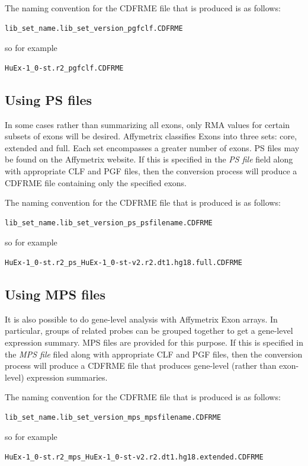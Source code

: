\documentclass[11pt]{report}
\begin{document}
The naming convention for the CDFRME file that is produced is as follows: 
\begin{verbatim}
lib_set_name.lib_set_version_pgfclf.CDFRME 
\end{verbatim}
so for example 
\begin{verbatim}
HuEx-1_0-st.r2_pgfclf.CDFRME
\end{verbatim}



\subsection{Using PS files}

In some cases rather than summarizing all exons, only RMA values for certain subsets of exons will be desired. Affymetrix classifies Exons into three sets: core, extended and full. Each set encompasses a greater number of exons. PS files may be found on the Affymetrix website. If this is specified in the {\it PS file} field along with appropriate CLF and PGF files, then the conversion process will produce a CDFRME file containing only the specified exons. 

The naming convention for the CDFRME file that is produced is as follows: 
\begin{verbatim}
lib_set_name.lib_set_version_ps_psfilename.CDFRME
\end{verbatim}
so for example 
\begin{verbatim}
HuEx-1_0-st.r2_ps_HuEx-1_0-st-v2.r2.dt1.hg18.full.CDFRME
\end{verbatim}

\subsection{Using MPS files}

It is also possible to do gene-level analysis with Affymetrix Exon arrays. In particular, groups of related probes can be grouped together to get a gene-level expression summary. MPS files are provided for this purpose. If this is specified in the {\it MPS file} filed along with appropriate CLF and PGF files, then the conversion process will produce a CDFRME file that produces gene-level (rather than exon-level) expression summaries.

The naming convention for the CDFRME file that is produced is as follows:
\begin{verbatim}
lib_set_name.lib_set_version_mps_mpsfilename.CDFRME
\end{verbatim}
so for example
\begin{verbatim}
HuEx-1_0-st.r2_mps_HuEx-1_0-st-v2.r2.dt1.hg18.extended.CDFRME
\end{verbatim}
\end{document}
